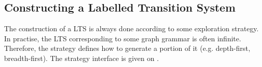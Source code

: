 
\subsection{Constructing a Labelled Transition System}

The construction of a LTS is always done according to some exploration
strategy. In practise, the LTS corresponding to some graph grammar is often
infinite. Therefore, the strategy defines how to generate a portion of it
(e.g. depth-first, breadth-first). The strategy interface is given on
.

